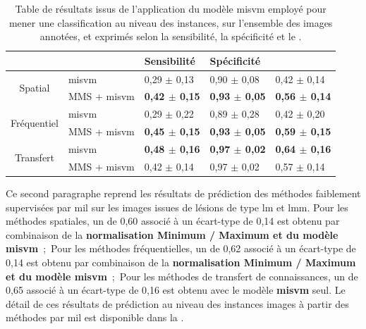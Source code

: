 \begin{table}[H]
    \centering
    \begin{tabular}{cllll}
        \toprule
        \multicolumn{1}{l}{}         &                      & Sensibilité               & Spécificité               & \Fscore{}                 \\ \midrule
        \multirow{2}{*}{Spatial}     & \gls{misvm}          & 0,29 $\pm$ 0,13             & 0,90 $\pm$ 0,08             & 0,42 $\pm$ 0,14             \\
                                     & MMS + \gls{misvm}    & \textbf{0,42 $\pm$ 0,15}    & \textbf{0,93 $\pm$ 0,05}    & \textbf{0,56 $\pm$ 0,14}    \\ \midrule
        \multirow{2}{*}{Fréquentiel} & \gls{misvm}          & 0,29 $\pm$ 0,22             & 0,89 $\pm$ 0,28             & 0,42 $\pm$ 0,20             \\
                                     & MMS + \gls{misvm}    & \textbf{0,45 $\pm$ 0,15}    & \textbf{0,93 $\pm$ 0,05}    & \textbf{0,59 $\pm$ 0,15}    \\ \midrule
        \multirow{2}{*}{Transfert}   & \gls{misvm}          & \textbf{0,48 $\pm$ 0,16}    & \textbf{0,97 $\pm$ 0,02}    & \textbf{0,64 $\pm$ 0,16}    \\
                                     & MMS + \gls{misvm}    & 0,42 $\pm$ 0,14             & 0,97 $\pm$ 0,02             & 0,57 $\pm$ 0,14             \\ \bottomrule
    \end{tabular}
    \caption{Table de résultats issus de l'application du modèle \gls{misvm} employé pour mener une classification au niveau des instances, sur l'ensemble des images annotées, et exprimés selon la sensibilité, la spécificité et le \fscore{}.}
    \label{tab:results_lesion_classification_weakly_image}
\end{table}

Ce second paragraphe reprend les résultats de prédiction des méthodes faiblement supervisées par \gls{mil} sur les images issues de lésions de type \gls{lm} et \gls{lmm}. Pour les méthodes spatiales, un \fscore{} de 0,60 associé à un écart-type de 0,14 est obtenu par combinaison de la \textbf{normalisation Minimum / Maximum et du modèle \gls{misvm}}~;~Pour les méthodes fréquentielles, un \fscore{} de 0,62 associé à un écart-type de 0,14 est obtenu par combinaison de la \textbf{normalisation Minimum / Maximum et du modèle \gls{misvm}}~;~Pour les méthodes de transfert de connaissances, un \fscore{} de 0,65 associé à un écart-type de 0,16 est obtenu avec le modèle \textbf{\gls{misvm}} seul. Le détail de ces résultats de prédiction au niveau des instances images à partir des méthodes par \gls{mil} est disponible dans la .\par

